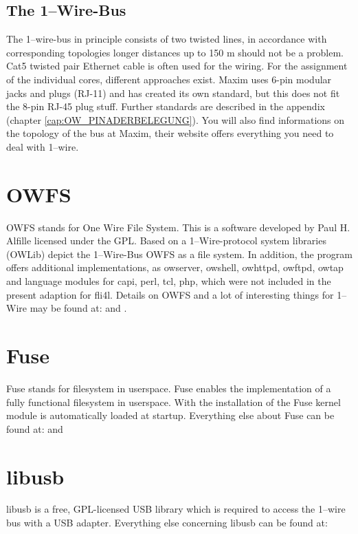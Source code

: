 \subsection{The 1--Wire-Bus}
The 1--wire-bus in principle consists of two twisted lines, in accordance with
corresponding topologies longer distances up to 150 m should not be a problem.
Cat5 twisted pair Ethernet cable is often used for the wiring.
For the assignment of the individual cores, different approaches exist. Maxim
uses 6-pin modular jacks and plugs (RJ-11) and has created its own standard,
but this does not fit the 8-pin RJ-45 plug stuff. Further standards are
described in the appendix (chapter \ref{cap:OW_PINADERBELEGUNG}).
You will also find informations on the topology of the bus at Maxim, their
website offers everything you need to deal with 1--wire.

{
\section{OWFS}
}
OWFS  stands for \glqq{}One Wire File System\grqq{}. This is a software developed by Paul H.
Alfille licensed under the GPL. Based on a 1--Wire-protocol system libraries (OWLib) depict
the 1--Wire-Bus OWFS as a file system. In addition, the program offers additional implementations,
as owserver, owshell, owhttpd, owftpd, owtap and language modules for capi,
perl, tcl, php, which were not included in the present adaption for fli4l.
Details on OWFS and a lot of interesting things for 1--Wire may be found
at:  and .

\section{Fuse}
Fuse stands for \glqq{}filesystem in userspace\grqq{}. Fuse enables the implementation of a
fully functional filesystem in userspace.
With the installation of  the Fuse kernel module is automatically loaded at startup.
Everything else about Fuse can be found at:
 and 

\section{libusb}
libusb is a free, GPL-licensed USB library which is required to access
the 1--wire bus with a USB adapter.
Everything else concerning libusb can be found at: 

